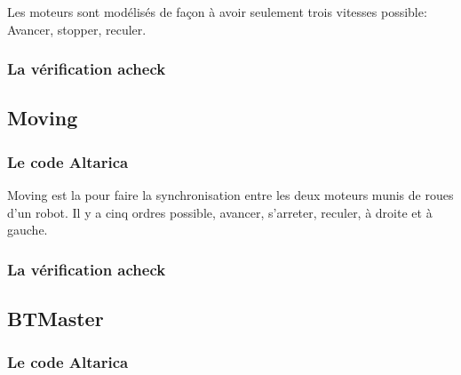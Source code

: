   Les moteurs sont modélisés de façon à avoir seulement trois vitesses possible: Avancer, stopper, reculer.

  \subsubsection{La vérification acheck}

  \subsection{Moving}
  \subsubsection{Le code Altarica}
  

  Moving est la pour faire la synchronisation entre les deux moteurs munis de roues d'un robot. Il y a cinq ordres possible, avancer, s'arreter, reculer, à droite et à gauche.

  \subsubsection{La vérification acheck}

 
  \subsection{BTMaster}

  \subsubsection{Le code Altarica}
  

